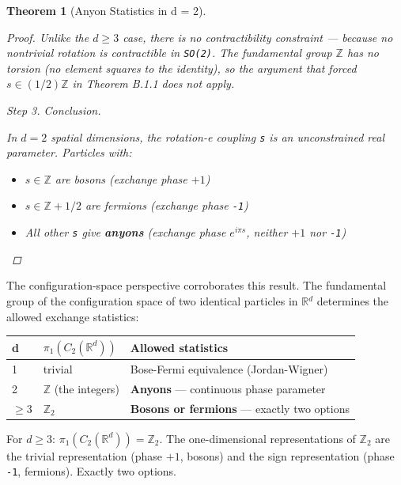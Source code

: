 \documentclass[aps,prd,preprint,superscriptaddress,longbibliography,floatfix]{revtex4-2}
\newtheorem{theorem}{Theorem}[section]
\theoremstyle{remark}
\begin{document}
\begin{theorem}[Anyon Statistics in d = 2]
\begin{proof}
Unlike the $d \geq 3$ case, there is no contractibility constraint --- because no nontrivial rotation is contractible in \texttt{SO(2)}. The fundamental group \texttt{$\mathbb{Z}$} has no torsion (no element squares to the identity), so the argument that forced $s \in (1/2)\mathbb{Z}$ in Theorem B.1.1 does not apply.

\textit{Step 3. Conclusion.}

In $d = 2$ spatial dimensions, the rotation-e coupling \texttt{s} is an unconstrained real parameter. Particles with:


\begin{itemize}
  \item $s \in \mathbb{Z}$ are bosons (exchange phase $+1$)
  \item $s \in \mathbb{Z} + 1/2$ are fermions (exchange phase \texttt{-1})
  \item All other \texttt{s} give \textbf{anyons} (exchange phase $e^{i\pi s}$, neither $+1$ nor \texttt{-1})
\end{itemize}

\end{proof}
\end{theorem}

The configuration-space perspective corroborates this result. The fundamental group of the configuration space of two identical particles in \texttt{$\mathbb{R}$$^{d}$} determines the allowed exchange statistics:


\begin{table}[H]
\begin{ruledtabular}
\begin{tabular}{p{5.0cm}p{5.0cm}p{5.0cm}}
d & $\pi_{1}(C_{2}(\mathbb{R}^{d}))$ & Allowed statistics \\
\hline
1 & trivial & Bose-Fermi equivalence (Jordan-Wigner) \\
2 & \textbf{\texttt{$\mathbb{Z}$}} (the integers) & \textbf{Anyons} --- continuous phase parameter \\
$\geq 3$ & \textbf{$\mathbb{Z}_{2}$} & \textbf{Bosons or fermions} --- exactly two options \\
\end{tabular}
\end{ruledtabular}
\end{table}

For $d \geq 3$: $\pi_{1}(C_{2}(\mathbb{R}^{d})) = \mathbb{Z}_{2}$. The one-dimensional representations of $\mathbb{Z}_{2}$ are the trivial representation (phase $+1$, bosons) and the sign representation (phase \texttt{-1}, fermions). Exactly two options.
\end{document}
